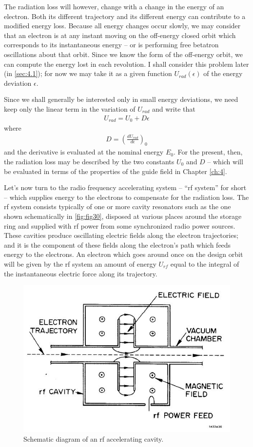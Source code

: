 The radiation loss will however, change with a change in the energy of an electron. Both its different trajectory and its different energy can contribute to a modified energy loss. Because all energy changes occur slowly, we may consider that an electron is at any instant moving on the off-energy closed orbit which corresponds to its instantaneous energy -- or is performing free betatron oscillations about that orbit. Since we know the form of the off-energy orbit, we can compute the energy lost in each revolution. I shall consider this problem later (in \autoref{sec:4.1}); for now we may take it as a given function $U_{rad}(\epsilon)$ of the energy deviation $\epsilon$.

Since we shall generally be interested only in small energy deviations, we need keep only the linear term in the variation of $U_{rad}$ and write that
\begin{align}
	U_{rad} = U_0 + D\epsilon\label{eq:3.23}
\end{align}
where
\begin{align} \label{eq:3.24}
	D = \left(\frac{dU_{rad}}{d\epsilon}\right)_0
\end{align}
and the derivative is evaluated at the nominal energy $E_0$. For the present, then, the radiation loss may be described by the two constants $U_0$ and $D$ -- which will be evaluated in terms of the properties of the guide field in Chapter \ref{ch:4}.

Let's now turn to the radio frequency accelerating system -- “rf system” for short -- which supplies energy to the electrons to compensate for the radiation loss. The rf system consists typically of one or more cavity resonators such as the one shown schematically in \autoref{fig:fig30}, disposed at various places around the storage ring
and supplied with rf power from some synchronized radio power sources. These cavities produce oscillating electric fields along the electron trajectories; and it is the component of these fields along the electron's path which feeds energy to the electrons. An electron which goes around once on the design orbit will be given by the rf system an amount of energy $U_{rf}$ equal to the integral of the instantaneous electric force along its trajectory.
 
 \begin{figure}[!htb]
 	\centering
 	\includegraphics[width=0.7\linewidth]{./Figuras/fig30.jpeg}
 	\caption{Schematic diagram of an rf accelerating cavity.}
 	\label{fig:fig30}
 \end{figure}
 
